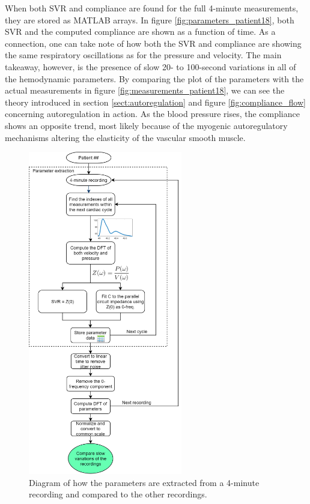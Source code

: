 When both SVR and compliance are found for the full 4-minute measurements, they are stored as MATLAB arrays. In figure \ref{fig:parameters_patient18}, both SVR and the computed compliance are shown as a function of time. As a connection, one can take note of how both the SVR and compliance are showing the same respiratory oscillations as for the pressure and velocity. The main takeaway, however, is the presence of slow 20- to 100-second variations in all of the hemodynamic parameters. By comparing the plot of the parameters with the actual measurements in figure \ref{fig:measurements_patient18}, we can see the theory introduced in section \ref{sect:autoregulation} and figure \ref{fig:compliance_flow} concerning autoregulation in action.  As the blood pressure rises, the compliance shows an opposite trend, most likely because of the myogenic autoregulatory mechanisms altering the elasticity of the vascular smooth muscle.

\newpage

\begin{figure}[h!]
    \centering
    \includegraphics[width=0.6\textwidth]{fig/methods/parameter_diagram.png}
    \caption{Diagram of how the parameters are extracted from a 4-minute recording and compared to the other recordings.}
    \label{fig:parameter_diagram}
\end{figure}{}

